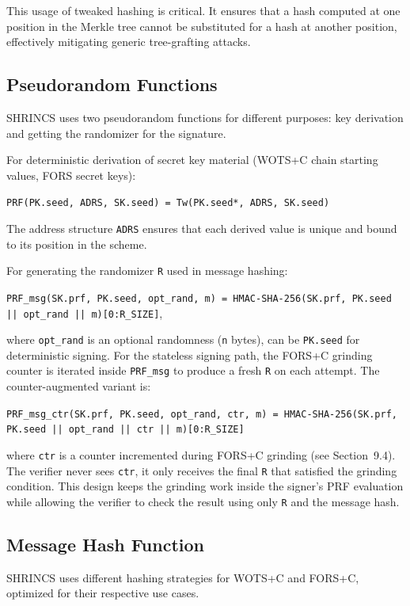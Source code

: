 This usage of tweaked hashing is critical. It ensures that a hash computed at one position in the Merkle tree cannot be substituted for a hash at another position, effectively mitigating generic tree-grafting attacks.

\subsection{Pseudorandom Functions}
SHRINCS uses two pseudorandom functions for different purposes: key derivation and getting the randomizer for the signature.

For deterministic derivation of secret key material (WOTS+C chain starting values, FORS secret keys):

\begin{center}
    \texttt{PRF(PK.seed, ADRS, SK.seed) = Tw(PK.seed*, ADRS, SK.seed)}
\end{center}

The address structure \texttt{ADRS} ensures that each derived value is unique and bound to its position in the scheme.

For generating the randomizer \texttt{R} used in message hashing:

\begin{center}
    \texttt{PRF\_msg(SK.prf, PK.seed, opt\_rand, m) = HMAC-SHA-256(SK.prf, PK.seed || opt\_rand || m)[0:R\_SIZE]},
\end{center}
where \texttt{opt\_rand} is an optional randomness (\texttt{n} bytes), can be \texttt{PK.seed} for deterministic signing.
For the stateless signing path, the FORS+C grinding counter is iterated inside \texttt{PRF\_msg} to produce a fresh \texttt{R} on each attempt. The counter-augmented variant is:

\begin{center}
    \texttt{PRF\_msg\_ctr(SK.prf, PK.seed, opt\_rand, ctr, m) = HMAC-SHA-256(SK.prf, PK.seed || opt\_rand || ctr || m)[0:R\_SIZE]}
\end{center}

where \texttt{ctr} is a counter incremented during FORS+C grinding (see Section~9.4). The verifier never sees \texttt{ctr}, it only receives the final \texttt{R} that satisfied the grinding condition. This design keeps the grinding work inside the signer's PRF evaluation while allowing the verifier to check the result using only \texttt{R}  and the message hash.

\subsection{Message Hash Function}
SHRINCS uses different hashing strategies for WOTS+C and FORS+C, optimized for their respective use cases.

